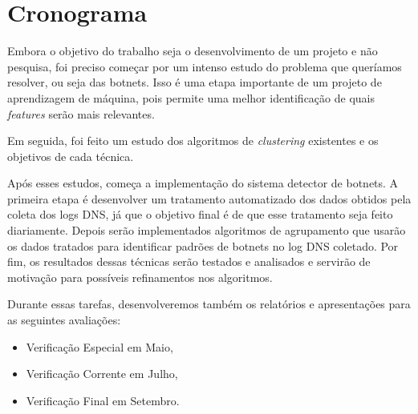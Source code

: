 \chapter{Cronograma}
Embora o objetivo do trabalho seja o desenvolvimento de um projeto e não pesquisa, foi preciso começar por um intenso estudo do problema que queríamos resolver, ou seja das botnets. Isso é uma etapa importante de um projeto de aprendizagem de máquina, pois permite uma melhor identificação de quais \textit{features} serão mais relevantes.

Em seguida, foi feito um estudo dos algoritmos de \textit{clustering} existentes e os objetivos de cada técnica.

Após esses estudos, começa a implementação do sistema detector de botnets. A primeira etapa é desenvolver um tratamento automatizado dos dados obtidos pela coleta dos logs DNS, já que o objetivo final é de que esse tratamento seja feito diariamente. Depois serão implementados algoritmos de agrupamento que usarão os dados tratados para identificar padrões de botnets no log DNS coletado. Por fim, os resultados dessas técnicas serão testados e analisados e servirão de motivação para possíveis refinamentos nos algoritmos.

Durante essas tarefas, desenvolveremos também os relatórios e apresentações para as seguintes avaliações:

\begin{itemize}  
\item Verificação Especial em Maio,
\item Verificação Corrente em Julho,
\item Verificação Final em Setembro.
\end{itemize}

